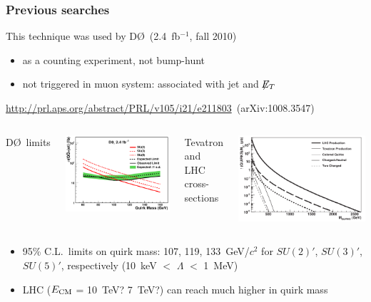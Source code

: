 \documentclass[compress]{beamer}
\newcommand{\s}[1]{{\mbox{\scriptsize #1}}}
\begin{document}
\begin{frame}
\frametitle{Previous searches}

This technique was used by D\O\ (2.4~fb$^{-1}$, fall 2010)
\begin{itemize}
\item as a counting experiment, not bump-hunt
\item not triggered in muon system: associated with jet and $\not\!\!{E_{T}}$
\end{itemize}
\mbox{\url{http://prl.aps.org/abstract/PRL/v105/i21/e211803} (arXiv:1008.3547)\hspace{-1 cm}}

\vspace{0.2 cm}
\begin{columns}
\centering D\O\ limits

\includegraphics[height=3.5 cm]{d0_limit.png}

\centering Tevatron and LHC cross-sections

\includegraphics[height=3.5 cm]{production_crosssection.png}
\end{columns}

\vspace{0.2 cm}
\begin{itemize}
\item 95\% C.L.\ limits on quirk mass: 107, 119, 133~GeV/$c^2$ for $SU(2)'$, $SU(3)'$, $SU(5)'$, respectively (10~keV $<$ $\Lambda$ $<$ 1~MeV)
\item LHC ($E_\s{CM}$ = 10~TeV? 7~TeV?) can reach much higher in quirk mass
\end{itemize}
\end{frame}
\end{document}
